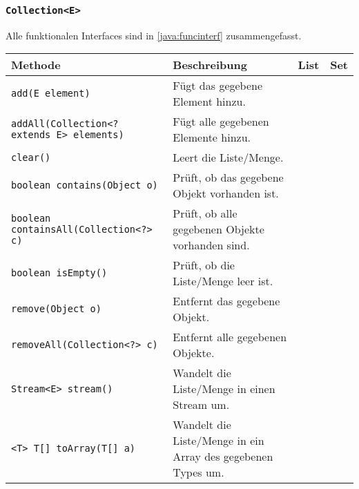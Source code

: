		\subsubsection{\texttt{Collection<E>}}
			Alle funktionalen Interfaces sind in \ref{java:funcinterf} zusammengefasst.

			\begin{sidewaystable}
				\centering
				\begin{tabular}{l | p{8cm} | c | c}
					Methode                                                      & Beschreibung                                                             & List       & Set        \\
					\hline
					\texttt{add(E element)}                                      & Fügt das gegebene Element hinzu.                                         & \texttimes & \texttimes \\
					\texttt{addAll(Collection<? extends E> elements)}            & Fügt alle gegebenen Elemente hinzu.                                      & \texttimes & \texttimes \\
					\texttt{clear()}                                             & Leert die Liste/Menge.                                                   & \texttimes & \texttimes \\
					\texttt{boolean contains(Object o)}                          & Prüft, ob das gegebene Objekt vorhanden ist.                             & \texttimes & \texttimes \\
					\texttt{boolean containsAll(Collection<?> c)}                & Prüft, ob alle gegebenen Objekte vorhanden sind.                         & \texttimes & \texttimes \\
					\texttt{boolean isEmpty()}                                   & Prüft, ob die Liste/Menge leer ist.                                      & \texttimes & \texttimes \\
					\texttt{remove(Object o)}                                    & Entfernt das gegebene Objekt.                                            & \texttimes & \texttimes \\
					\texttt{removeAll(Collection<?> c)}                          & Entfernt alle gegebenen Objekte.                                         & \texttimes & \texttimes \\
					\texttt{Stream<E> stream()}                                  & Wandelt die Liste/Menge in einen Stream um.                              & \texttimes & \texttimes \\
					\texttt{<T> T[] toArray(T[] a)}                              & Wandelt die Liste/Menge in ein Array des gegebenen Types um.             & \texttimes & \texttimes \\

\end{tabular}
\end{sidewaystable}
